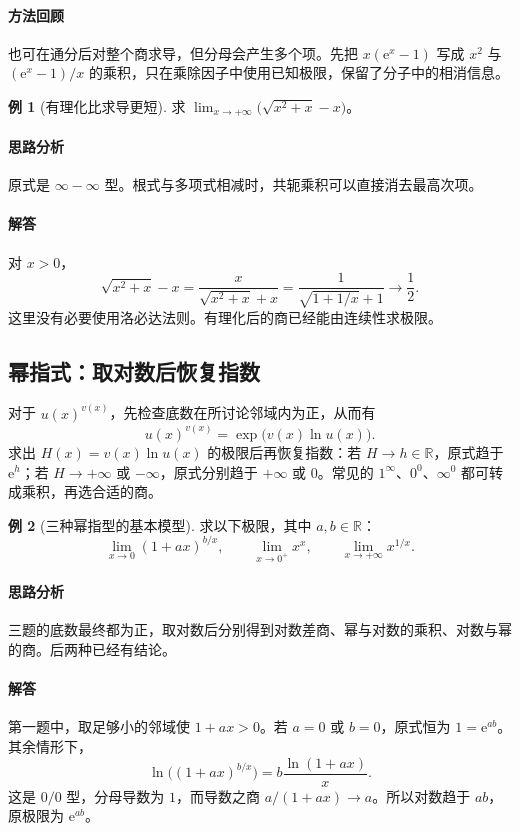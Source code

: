 \documentclass[UTF8,fontset=fandol,12pt,oneside,openany]{ctexrep}
\newcommand{\R}{\mathbb R}
\newcommand{\ee}{\mathrm e}
\theoremstyle{definition}
\newtheorem{example}{例}[chapter]
\begin{document}
\paragraph{方法回顾}
也可在通分后对整个商求导，但分母会产生多个项。先把 $x(\ee^x-1)$ 写成 $x^2$ 与 $(\ee^x-1)/x$ 的乘积，只在乘除因子中使用已知极限，保留了分子中的相消信息。

\begin{example}[有理化比求导更短]
求 $\displaystyle\lim_{x\to+\infty}\bigl(\sqrt{x^2+x}-x\bigr)$。
\end{example}
\paragraph{思路分析}
原式是 $\infty-\infty$ 型。根式与多项式相减时，共轭乘积可以直接消去最高次项。
\paragraph{解答}
对 $x>0$，
\[
\sqrt{x^2+x}-x
=\frac{x}{\sqrt{x^2+x}+x}
=\frac1{\sqrt{1+1/x}+1}\to\frac12.
\]
这里没有必要使用洛必达法则。有理化后的商已经能由连续性求极限。

\subsection{幂指式：取对数后恢复指数}
\label{lec:07:powers}

对于 $u(x)^{v(x)}$，先检查底数在所讨论邻域内为正，从而有
\[
u(x)^{v(x)}=\exp\bigl(v(x)\ln u(x)\bigr).
\]
求出 $H(x)=v(x)\ln u(x)$ 的极限后再恢复指数：若 $H\to h\in\R$，原式趋于 $\ee^h$；若 $H\to+\infty$ 或 $-\infty$，原式分别趋于 $+\infty$ 或 $0$。常见的 $1^\infty$、$0^0$、$\infty^0$ 都可转成乘积，再选合适的商。

\begin{example}[三种幂指型的基本模型]
求以下极限，其中 $a,b\in\R$：
\[
\lim_{x\to0}(1+ax)^{b/x},\qquad
\lim_{x\to0^+}x^x,\qquad
\lim_{x\to+\infty}x^{1/x}.
\]
\end{example}
\paragraph{思路分析}
三题的底数最终都为正，取对数后分别得到对数差商、幂与对数的乘积、对数与幂的商。后两种已经有结论。
\paragraph{解答}
第一题中，取足够小的邻域使 $1+ax>0$。若 $a=0$ 或 $b=0$，原式恒为 $1=\ee^{ab}$。其余情形下，
\[
\ln\bigl((1+ax)^{b/x}\bigr)
=b\frac{\ln(1+ax)}x.
\]
这是 $0/0$ 型，分母导数为 $1$，而导数之商 $a/(1+ax)\to a$。所以对数趋于 $ab$，原极限为 $\ee^{ab}$。
\end{document}
